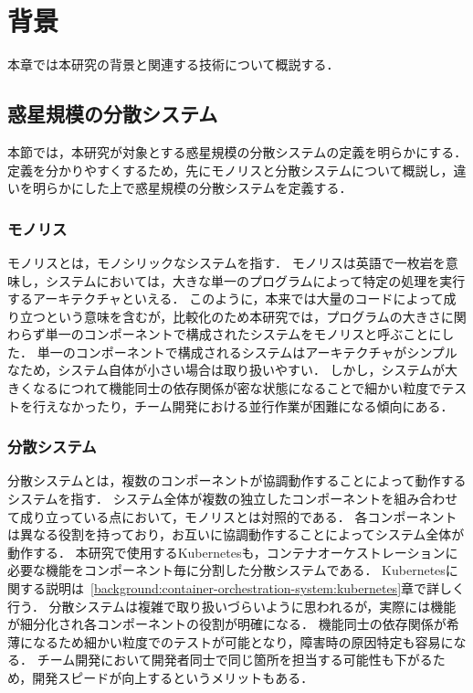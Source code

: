 \chapter{背景}
\label{background}

本章では本研究の背景と関連する技術について概説する．

\section{惑星規模の分散システム}
\label{bg:definition}

本節では，本研究が対象とする惑星規模の分散システムの定義を明らかにする．
定義を分かりやすくするため，先にモノリスと分散システムについて概説し，違いを明らかにした上で惑星規模の分散システムを定義する．

\subsection{モノリス}
\label{bg:definition:monolith}

モノリスとは，モノシリックなシステムを指す．
モノリスは英語で一枚岩を意味し，システムにおいては，大きな単一のプログラムによって特定の処理を実行するアーキテクチャといえる．
このように，本来では大量のコードによって成り立つという意味を含むが，比較化のため本研究では，プログラムの大きさに関わらず単一のコンポーネントで構成されたシステムをモノリスと呼ぶことにした．
単一のコンポーネントで構成されるシステムはアーキテクチャがシンプルなため，システム自体が小さい場合は取り扱いやすい．
しかし，システムが大きくなるにつれて機能同士の依存関係が密な状態になることで細かい粒度でテストを行えなかったり，チーム開発における並行作業が困難になる傾向にある．

\subsection{分散システム}
\label{bg:definition:distributed-system}

分散システムとは，複数のコンポーネントが協調動作することによって動作するシステムを指す．
システム全体が複数の独立したコンポーネントを組み合わせて成り立っている点において，モノリスとは対照的である．
各コンポーネントは異なる役割を持っており，お互いに協調動作することによってシステム全体が動作する．
本研究で使用するKubernetesも，コンテナオーケストレーションに必要な機能をコンポーネント毎に分割した分散システムである．
Kubernetesに関する説明は~\ref{background:container-orchestration-system:kubernetes}章で詳しく行う．
分散システムは複雑で取り扱いづらいように思われるが，実際には機能が細分化され各コンポーネントの役割が明確になる．
機能同士の依存関係が希薄になるため細かい粒度でのテストが可能となり，障害時の原因特定も容易になる．
チーム開発において開発者同士で同じ箇所を担当する可能性も下がるため，開発スピードが向上するというメリットもある．

